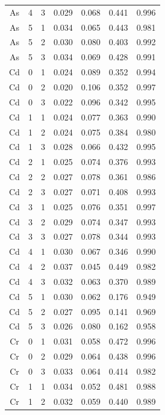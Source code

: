 \documentclass[ms, hidelinks]{uncgdissertationexp3}
\theoremstyle{plain}
\theoremstyle{definition}
\theoremstyle{remark}
\begin{document}
\begin{longtable}{ccccccc}
  \rowcolor{gray!6}  As & 4 & 3 & 0.029 & 0.068 & 0.441 & 0.996\\
  As & 5 & 1 & 0.034 & 0.065 & 0.443 & 0.981\\
  \rowcolor{gray!6}  As & 5 & 2 & 0.030 & 0.080 & 0.403 & 0.992\\
  As & 5 & 3 & 0.034 & 0.069 & 0.428 & 0.991\\
  \rowcolor{gray!6}  Cd & 0 & 1 & 0.024 & 0.089 & 0.352 & 0.994\\
  Cd & 0 & 2 & 0.020 & 0.106 & 0.352 & 0.997\\
  \rowcolor{gray!6}  Cd & 0 & 3 & 0.022 & 0.096 & 0.342 & 0.995\\
  Cd & 1 & 1 & 0.024 & 0.077 & 0.363 & 0.990\\
  \rowcolor{gray!6}  Cd & 1 & 2 & 0.024 & 0.075 & 0.384 & 0.980\\
  Cd & 1 & 3 & 0.028 & 0.066 & 0.432 & 0.995\\
  \rowcolor{gray!6}  Cd & 2 & 1 & 0.025 & 0.074 & 0.376 & 0.993\\
  Cd & 2 & 2 & 0.027 & 0.078 & 0.361 & 0.986\\
  \rowcolor{gray!6}  Cd & 2 & 3 & 0.027 & 0.071 & 0.408 & 0.993\\
  Cd & 3 & 1 & 0.025 & 0.076 & 0.351 & 0.997\\
  \rowcolor{gray!6}  Cd & 3 & 2 & 0.029 & 0.074 & 0.347 & 0.993\\
  Cd & 3 & 3 & 0.027 & 0.078 & 0.344 & 0.993\\
  \rowcolor{gray!6}  Cd & 4 & 1 & 0.030 & 0.067 & 0.346 & 0.990\\
  Cd & 4 & 2 & 0.037 & 0.045 & 0.449 & 0.982\\
  \rowcolor{gray!6}  Cd & 4 & 3 & 0.032 & 0.063 & 0.370 & 0.989\\
  Cd & 5 & 1 & 0.030 & 0.062 & 0.176 & 0.949\\
  \rowcolor{gray!6}  Cd & 5 & 2 & 0.027 & 0.095 & 0.141 & 0.969\\
  Cd & 5 & 3 & 0.026 & 0.080 & 0.162 & 0.958\\
  \rowcolor{gray!6}  Cr & 0 & 1 & 0.031 & 0.058 & 0.472 & 0.996\\
  Cr & 0 & 2 & 0.029 & 0.064 & 0.438 & 0.996\\
  \rowcolor{gray!6}  Cr & 0 & 3 & 0.033 & 0.064 & 0.414 & 0.982\\
  Cr & 1 & 1 & 0.034 & 0.052 & 0.481 & 0.988\\
  \rowcolor{gray!6}  Cr & 1 & 2 & 0.032 & 0.059 & 0.440 & 0.989\\

\end{longtable}
\end{document}
